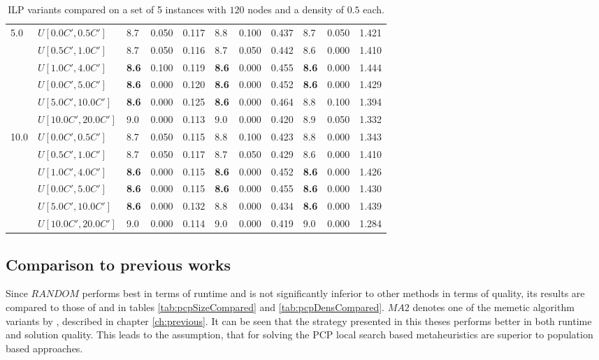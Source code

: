 \begin{table}[h]
{\begin{tabular}{|l|l||l|l|l||l|l|l||l|l|l|}
      \hline\hline
      \multirow{6}{*}{5.0} & $U[0.0C',0.5C']$ & 8.7 & 0.050 & 0.117 & 8.8 & 0.100 & 0.437 & 8.7 & 0.050 & 1.421 \\
       & $U[0.5C',1.0C']$ & 8.7 & 0.050 & 0.116 & 8.7 & 0.050 & 0.442 & 8.6 & 0.000 & 1.410 \\
       & $U[1.0C',4.0C']$ & \textbf{8.6} & 0.100 & 0.119 & \textbf{8.6} & 0.000 & 0.455 & \textbf{8.6} & 0.000 & 1.444 \\
       & $U[0.0C',5.0C']$ & \textbf{8.6} & 0.000 & 0.120 & \textbf{8.6} & 0.000 & 0.452 & \textbf{8.6} & 0.000 & 1.429 \\
       & $U[5.0C',10.0C']$ & \textbf{8.6} & 0.000 & 0.125 & \textbf{8.6} & 0.000 & 0.464 & 8.8 & 0.100 & 1.394 \\
       & $U[10.0C',20.0C']$ & 9.0 & 0.000 & 0.113 & 9.0 & 0.000 & 0.420 & 8.9 & 0.050 & 1.332 \\
      \hline\hline
      \multirow{6}{*}{10.0} & $U[0.0C',0.5C']$ & 8.7 & 0.050 & 0.115 & 8.8 & 0.100 & 0.423 & 8.8 & 0.000 & 1.343 \\
       & $U[0.5C',1.0C']$ & 8.7 & 0.050 & 0.117 & 8.7 & 0.050 & 0.429 & 8.6 & 0.000 & 1.410 \\
       & $U[1.0C',4.0C']$ & \textbf{8.6} & 0.000 & 0.115 & \textbf{8.6} & 0.000 & 0.452 & \textbf{8.6} & 0.000 & 1.426 \\
       & $U[0.0C',5.0C']$ & \textbf{8.6} & 0.000 & 0.115 & \textbf{8.6} & 0.000 & 0.455 & \textbf{8.6} & 0.000 & 1.430 \\
       & $U[5.0C',10.0C']$ & \textbf{8.6} & 0.000 & 0.132 & 8.8 & 0.000 & 0.434 & \textbf{8.6} & 0.000 & 1.439 \\
       & $U[10.0C',20.0C']$ & 9.0 & 0.000 & 0.114 & 9.0 & 0.000 & 0.419 & 9.0 & 0.000 & 1.284 \\
      \hline
      \end{tabular}
      }
      \caption{ILP variants compared on a set of 5 instances with $120$ nodes and a density of $0.5$ each.}
      \label{tab:pcpn120RecoloredTT}\end{table}

\clearpage

\subsection{Comparison to previous works}
Since $RANDOM$ performs best in terms of runtime and is not significantly inferior to other methods in terms of quality, its results are compared to those of \cite{frota-07} and \cite{pop-13} in tables \ref{tab:pcpSizeCompared} and \ref{tab:pcpDensCompared}. $MA2$ denotes one of the memetic algorithm variants by \cite{pop-13}, described in chapter \ref{ch:previous}. It can be seen that the strategy presented in this theses performs better in both runtime and solution quality. This leads to the assumption, that for solving the PCP local search based metaheuristics are superior to population based approaches.\\

